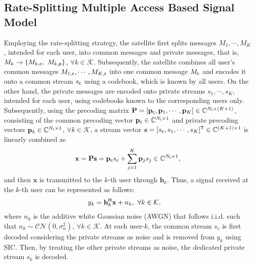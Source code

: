 \documentclass[draftclsnofoot, onecolumn, comsoc, 12pt]{IEEEtran}
\begin{document}
\subsection{Rate-Splitting Multiple Access Based Signal Model}
Employing the rate-splitting strategy, the satellite first splits messages $M_{1}, \cdots, M_{K}$, intended for each user, into common messages and private messages, that is, $M_k \rightarrow \{M_{k,{\sf{c}}}, \,\, M_{k,{\sf{p}}} \}$, $\forall k \in \mathcal{K}$. 
Subsequently, the satellite combines all user's common messages $M_{1,{\sf{c}}}, \cdots, M_{K,{\sf{c}}}$ into one common message $M_{\sf{c}}$ and encodes it onto a common stream $s_{\sf{c}}$ using a codebook, which is known by all users. 
On the other hand, the private messages are encoded onto private streams $s_1, \cdots, s_K$, intended for each user, using codebooks known to the corresponding users only. 
Subsequently, using the precoding matrix $\mathbf{P}=[\mathbf{p}_{\sf{c}}, \mathbf{p}_1,\cdots,\mathbf{p}_K]\in \mathbb{C}^{{N_{\sf{t}}}\times{(K+1)}}$, consisting of the common precoding vector $\mathbf{p}_{\sf{c}}\in \mathbb{C}^{{N_{\sf{t}}}\times{1}}$ and private precoding vectors $\mathbf{p}_{k} \in \mathbb{C}^{{N_{{\sf{t}}}}\times{1}}$, $\forall k \in \mathcal{K}$, a stream vector $\mathbf{s}=[s_{\sf{c}}, s_1, \cdots, s_K]^{\sf{T}}\in \mathbb{C}^{{(K+1)}\times{1}}$ is linearly combined as 
\begin{align}
\label{TS_Eq}
\mathbf{x} = \mathbf{P}\mathbf{s} = \mathbf{p}_{\sf{c}} s_{\sf{c}} + \sum_{j=1}^{K}{\mathbf{p}_j s_j}\in \mathbb{C}^{{N_{\sf{t}}}\times{1}}, 
\end{align}
and then $\mathbf{x}$ is transmitted to the $k$-th user through $\mathbf{h}_k$. 
Thus, a signal received at the $k$-th user can be represented as follows:
\begin{align}
    \label{RS_Eq} 
    y_{k} & = \mathbf{h}_{k}^{\sf{H}}\mathbf{x} + n_{k}, \,\, \forall k \in \mathcal{K},
\end{align}
where $n_k$ is the additive white Gaussian noise (AWGN) that follows i.i.d. such that $n_k\sim\mathcal{CN}{(0,\sigma_{n}^{2})}$, $\forall k \in \mathcal{K}$.
At each user-$k$, the common stream $s_c$ is first decoded considering the private streams as noise and is removed from $y_k$ using SIC. 
Then, by treating the other private streams as noise, the dedicated private stream $s_k$ is decoded.
\end{document}
